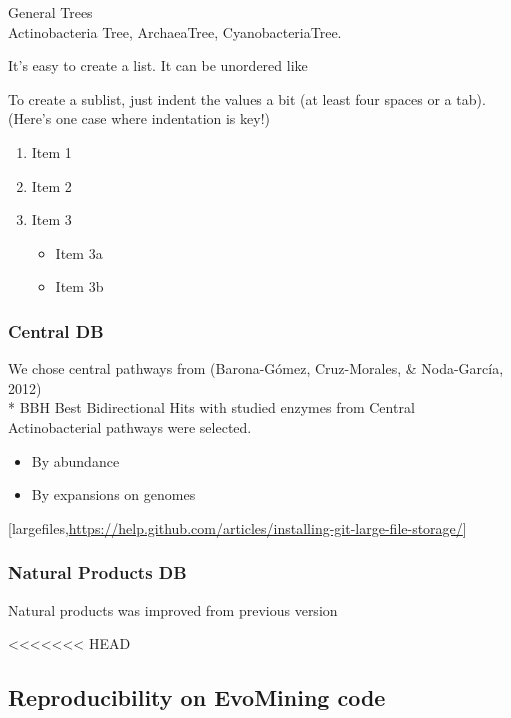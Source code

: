 \documentclass[12pt,twoside]{reedthesis}
\providecommand{\tightlist}{%
  \setlength{\itemsep}{0pt}\setlength{\parskip}{0pt}}
\begin{document}
  General Trees\\
  Actinobacteria Tree, ArchaeaTree, CyanobacteriaTree.
  
  It's easy to create a list. It can be unordered like
  
  To create a sublist, just indent the values a bit (at least four spaces
  or a tab). (Here's one case where indentation is key!)
  
  \begin{enumerate}
  \def\labelenumi{\arabic{enumi}.}
  \tightlist
  \item
    Item 1
  \item
    Item 2
  \item
    Item 3
  
    \begin{itemize}
    \tightlist
    \item
      Item 3a
    \item
      Item 3b
    \end{itemize}
  \end{enumerate}
  
  \subsubsection{Central DB}\label{central-db}
  
  We chose central pathways from (Barona-Gómez, Cruz-Morales, \&
  Noda-García, 2012)\\
  * BBH Best Bidirectional Hits with studied enzymes from Central
  Actinobacterial pathways were selected.
  
  \begin{itemize}
  \item
    By abundance
  \item
    By expansions on genomes
  \end{itemize}
  
  {[}largefiles,\url{https://help.github.com/articles/installing-git-large-file-storage/}{]}
  
  \subsubsection{Natural Products DB}\label{natural-products-db}
  
  Natural products was improved from previous version
  
<<<<<<< HEAD
  \subsection{Reproducibility on EvoMining
  code}\label{reproducibility-on-evomining-code}
  
\end{document}
